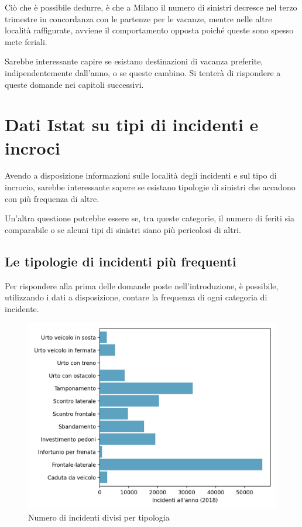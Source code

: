 \documentclass[a4paper,12pt]{report}
\begin{document}
Ciò che è possibile dedurre, è che a Milano il numero di sinistri decresce 
nel terzo trimestre in concordanza con le partenze per le vacanze, mentre nelle 
altre località raffigurate, avviene il comportamento opposta poiché 
queste sono spesso mete feriali.

Sarebbe interessante capire se esistano destinazioni di vacanza preferite, 
indipendentemente dall'anno, o se queste cambino. 
Si tenterà di rispondere a queste domande nei capitoli successivi.

\section{Dati Istat su tipi di incidenti e incroci}

Avendo a disposizione informazioni sulle località degli incidenti 
e sul tipo di incrocio, 
sarebbe interessante sapere se esistano tipologie di sinistri che accadono 
con più frequenza di altre. 

Un'altra questione potrebbe essere se, tra queste categorie, il numero di feriti 
sia comparabile o se alcuni tipi di sinistri siano più pericolosi di altri.

\subsection{Le tipologie di incidenti più frequenti}

Per rispondere alla prima delle domande poste nell'introduzione, è possibile, 
utilizzando i dati a disposizione, contare la frequenza di ogni categoria di incidente.

\begin{figure}
    \hfill\includegraphics[width=0.7\linewidth]{../src/incidenti/incidenti_senza_coords/localizzazione_incidente/tipo_incidente.png}\hspace*{\fill}
    \caption{Numero di incidenti divisi per tipologia}
    \label{fig:tipo-incidente}
\end{figure}
\end{document}
